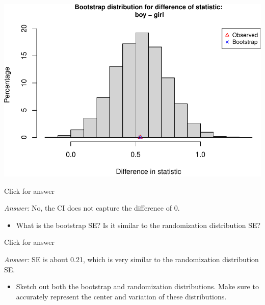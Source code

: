 \documentclass[
]{book}
\providecommand{\tightlist}{%
  \setlength{\itemsep}{0pt}\setlength{\parskip}{0pt}}
\begin{document}
\includegraphics[width=1\linewidth]{Class_Activity_13_files/figure-latex/unnamed-chunk-10-1}

Click for answer

\emph{Answer:} No, the CI does not capture the difference of 0.

\vspace*{.5in}

\begin{itemize}
\tightlist
\item
  What is the bootstrap SE? Is it similar to the randomization distribution SE?
\end{itemize}

Click for answer

\emph{Answer:} SE is about 0.21, which is very similar to the randomization distribution SE.

\vspace*{.5in}

\begin{itemize}
\tightlist
\item
  Sketch out both the bootstrap and randomization distributions. Make sure to accurately represent the center and variation of these distributions.
\end{itemize}
\end{document}
